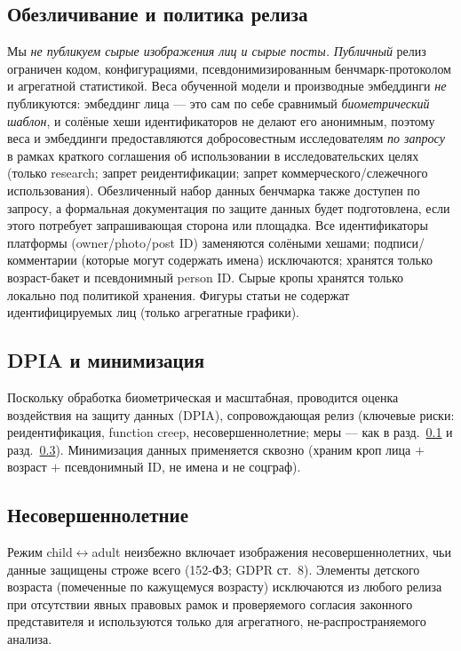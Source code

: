 \documentclass[journal]{IEEEtran}
\begin{document}
\subsection{Обезличивание и политика релиза}\label{sec:eth-deid}
Мы \emph{не публикуем сырые изображения лиц и сырые посты.} \emph{Публичный} релиз ограничен кодом, конфигурациями, псевдонимизированным бенчмарк-протоколом и агрегатной статистикой. Веса обученной модели и производные эмбеддинги \emph{не} публикуются: эмбеддинг лица --- это сам по себе сравнимый \emph{биометрический шаблон}, и солёные хеши идентификаторов не делают его анонимным, поэтому веса и эмбеддинги предоставляются добросовестным исследователям \emph{по запросу} в рамках краткого соглашения об использовании в исследовательских целях (только research; запрет реидентификации; запрет коммерческого/слежечного использования). Обезличенный набор данных бенчмарка также доступен по запросу, а формальная документация по защите данных будет подготовлена, если этого потребует запрашивающая сторона или площадка. Все идентификаторы платформы (owner/photo/post ID) заменяются солёными хешами; подписи/комментарии (которые могут содержать имена) исключаются; хранятся только возраст-бакет и псевдонимный person ID. Сырые кропы хранятся только локально под политикой хранения. Фигуры статьи не содержат идентифицируемых лиц (только агрегатные графики).

\subsection{DPIA и минимизация}\label{sec:eth-dpia}
Поскольку обработка биометрическая и масштабная, проводится оценка воздействия на защиту данных (DPIA), сопровождающая релиз (ключевые риски: реидентификация, function creep, несовершеннолетние; меры --- как в разд.~\ref{sec:eth-deid} и разд.~\ref{sec:eth-minors}). Минимизация данных применяется сквозно (храним кроп лица $+$ возраст $+$ псевдонимный ID, не имена и не соцграф).

\subsection{Несовершеннолетние}\label{sec:eth-minors}
Режим child$\leftrightarrow$adult неизбежно включает изображения несовершеннолетних, чьи данные защищены строже всего (152-ФЗ; GDPR ст.~8). Элементы детского возраста (помеченные по кажущемуся возрасту) исключаются из любого релиза при отсутствии явных правовых рамок и проверяемого согласия законного представителя и используются только для агрегатного, не-распространяемого анализа.
\end{document}
